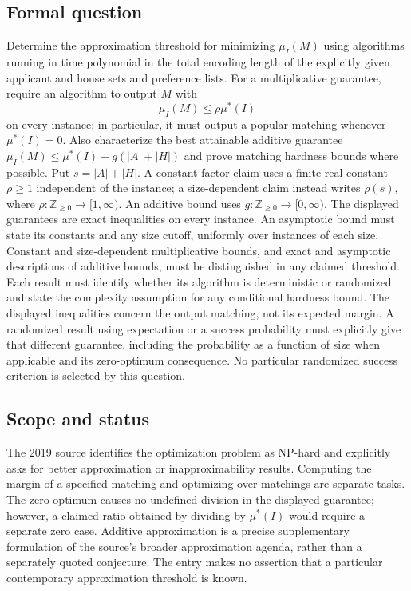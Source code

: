 \documentclass[11pt,a4paper]{article}
\begin{document}
\subsection*{Formal question}
Determine the approximation threshold for minimizing $\mu_I(M)$ using algorithms running in time polynomial in the total encoding length of the explicitly given applicant and house sets and preference lists. For a multiplicative guarantee, require an algorithm to output $M$ with
\[
 \mu_I(M)\le\rho\mu^*(I)
\]
on every instance; in particular, it must output a popular matching whenever $\mu^*(I)=0$. Also characterize the best attainable additive guarantee $\mu_I(M)\le\mu^*(I)+g(|A|+|H|)$ and prove matching hardness bounds where possible.
Put $s=|A|+|H|$. A constant-factor claim uses a finite real constant $\rho\ge1$ independent of the instance; a size-dependent claim instead writes $\rho(s)$, where $\rho:\mathbb Z_{\ge0}\to[1,\infty)$. An additive bound uses $g:\mathbb Z_{\ge0}\to[0,\infty)$. The displayed guarantees are exact inequalities on every instance. An asymptotic bound must state its constants and any size cutoff, uniformly over instances of each size. Constant and size-dependent multiplicative bounds, and exact and asymptotic descriptions of additive bounds, must be distinguished in any claimed threshold. Each result must identify whether its algorithm is deterministic or randomized and state the complexity assumption for any conditional hardness bound. The displayed inequalities concern the output matching, not its expected margin. A randomized result using expectation or a success probability must explicitly give that different guarantee, including the probability as a function of size when applicable and its zero-optimum consequence. No particular randomized success criterion is selected by this question.
\subsection*{Scope and status}
The 2019 source identifies the optimization problem as NP-hard and explicitly asks for better approximation or inapproximability results. Computing the margin of a specified matching and optimizing over matchings are separate tasks. The zero optimum causes no undefined division in the displayed guarantee; however, a claimed ratio obtained by dividing by $\mu^*(I)$ would require a separate zero case. Additive approximation is a precise supplementary formulation of the source's broader approximation agenda, rather than a separately quoted conjecture. The entry makes no assertion that a particular contemporary approximation threshold is known.
\end{document}
